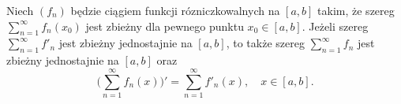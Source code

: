 \documentclass[leqno]{article}
\begin{document}
\begin{justify}
\begin{wniosek}
{
    Niech $(f_n)$ będzie ciągiem funkcji rózniczkowalnych na $[a,b]$ takim, że szereg 
    $\sum\limits_{n=1}^{\infty}f_n(x_0)$ jest zbieżny dla pewnego punktu $x_0 \in [a,b]$. Jeżeli
    szereg $\sum\limits_{n=1}^{\infty}f'_n$ jest zbieżny jednostajnie na $[a,b]$, to także szereg 
    $\sum\limits_{n=1}^{\infty}f_n$ jest zbieżny jednostajnie na $[a,b]$ oraz
    \[
        \Bigg( \sum\limits_{n=1}^{\infty}f_n(x)\Bigg)' = \sum\limits_{n=1}^{\infty}f'_n(x), \quad x \in [a,b]. 
    \]
}
\end{wniosek}

\end{justify}
\end{document}
